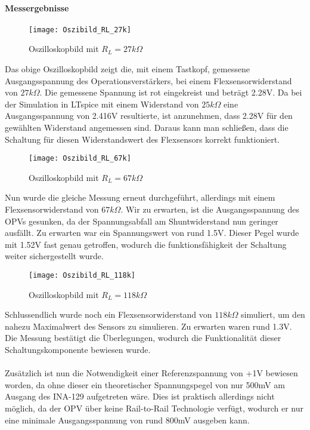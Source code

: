 \documentclass[titlepage,12pt,twoside]{article}
\begin{document}
\paragraph{Messergebnisse}
\label{par:Messergebnisse}
\hfill \break
\hfill \break
\begin{figure}[H]
	\begin{center}
		\scalebox{0.8}
		{\texttt{[image: Oszibild\_RL\_27k]}}
		\caption{Oszilloskopbild mit $R_{L} = 27k\Omega$}
		\label{fig:Oszibild_RL_27k}		
	\end{center}
\end{figure}
\hfill \break
Das obige Oszilloskopbild zeigt die, mit einem Tastkopf, gemessene Ausgangsspannung des Operationsverstärkers, bei einem Flexsensorwiderstand
von $27k\Omega$. Die gemessene Spannung ist rot eingekreist und beträgt 2.28V. Da bei der Simulation in LTspice mit einem Widerstand 
von $25k\Omega$ eine Ausgangsspannung von 2.416V resultierte, ist anzunehmen, dass 2.28V 
für den gewählten Widerstand angemessen sind. Daraus kann man schließen, dass die Schaltung
für diesen Widerstandswert des Flexsensors korrekt funktioniert.
\\
\begin{figure}[H]
	\begin{center}
		\scalebox{0.8}
		{\texttt{[image: Oszibild\_RL\_67k]}}
		\caption{Oszilloskopbild mit $R_{L} = 67k\Omega$}
		\label{fig:Oszibild_RL_67k}		
	\end{center}
\end{figure}
\hfill \break
Nun wurde die gleiche Messung erneut durchgeführt, allerdings mit einem Flexsensorwiderstand
von $67k\Omega$. Wir zu erwarten, ist die Ausgangsspannung des OPVs gesunken, da der 
Spannungsabfall am Shuntwiderstand nun geringer ausfällt. Zu erwarten war ein Spannungswert
von rund 1.5V. Dieser Pegel wurde mit 1.52V fast genau getroffen, wodurch die funktionsfähigkeit
der Schaltung weiter sichergestellt wurde.
\begin{figure}[H]
	\begin{center}
		\scalebox{0.8}
		{\texttt{[image: Oszibild\_RL\_118k]}}
		\caption{Oszilloskopbild mit $R_{L} = 118k\Omega$}
		\label{fig:Oszibild_RL_118k}		
	\end{center}
\end{figure}
\hfill \break
Schlussendlich wurde noch ein Flexsensorwiderstand von $118k\Omega$ simuliert, um den
nahezu Maximalwert des Sensors zu simulieren. Zu erwarten waren rund 1.3V. Die Messung
bestätigt die Überlegungen, wodurch die Funktionalität dieser Schaltungskomponente bewiesen
wurde. \\
\\
Zusätzlich ist nun die Notwendigkeit einer Referenzspannung von +1V bewiesen worden, da
ohne dieser ein theoretischer Spannungspegel von nur 500mV am Ausgang des INA-129 aufgetreten
wäre.  Dies ist praktisch allerdings nicht möglich, da der OPV über keine Rail-to-Rail
Technologie verfügt, wodurch er nur eine minimale Ausgangsspannung von rund 800mV ausgeben 
kann.
\\
\end{document}

